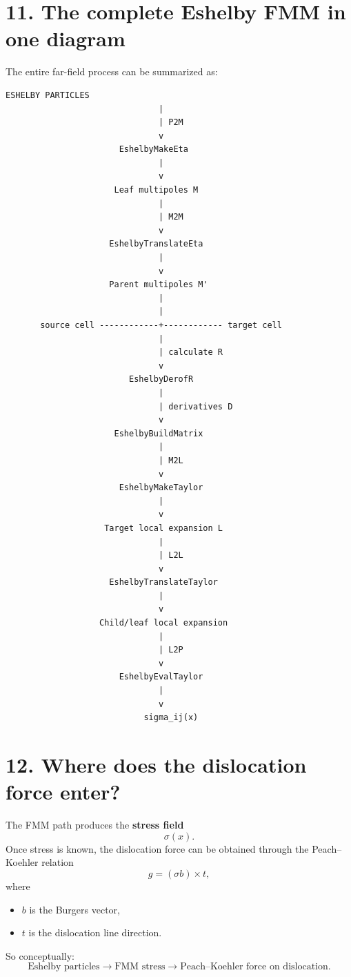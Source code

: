 \documentclass[11pt,a4paper]{article}
\begin{document}
\section*{11. The complete Eshelby FMM in one diagram}
The entire far-field process can be summarized as:
\begin{Verbatim}[fontsize=\small]
                       ESHELBY PARTICLES
                               |
                               | P2M
                               v
                       EshelbyMakeEta
                               |
                               v
                      Leaf multipoles M
                               |
                               | M2M
                               v
                     EshelbyTranslateEta
                               |
                               v
                     Parent multipoles M'
                               |
                               |
       source cell ------------+------------ target cell
                               |
                               | calculate R
                               v
                         EshelbyDerofR
                               |
                               | derivatives D
                               v
                      EshelbyBuildMatrix
                               |
                               | M2L
                               v
                       EshelbyMakeTaylor
                               |
                               v
                    Target local expansion L
                               |
                               | L2L
                               v
                     EshelbyTranslateTaylor
                               |
                               v
                   Child/leaf local expansion
                               |
                               | L2P
                               v
                       EshelbyEvalTaylor
                               |
                               v
                            sigma_ij(x)
\end{Verbatim}

\section*{12. Where does the dislocation force enter?}
The FMM path produces the \textbf{stress field}
\[\sigma(x).\]
Once stress is known, the dislocation force can be obtained through the Peach--Koehler relation
\[\boxed{g=(\sigma b)\times t,}\]
where
\begin{itemize}
\item \(b\) is the Burgers vector,
\item \(t\) is the dislocation line direction.
\end{itemize}
So conceptually:
\[\boxed{\text{Eshelby particles}\rightarrow\text{FMM stress}\rightarrow\text{Peach--Koehler force on dislocation}.}\]
\end{document}
